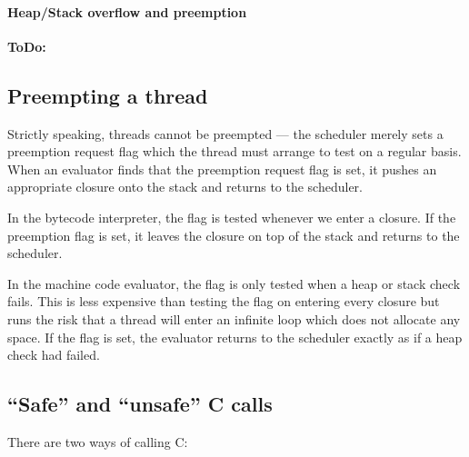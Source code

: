 \documentclass[11pt]{article}
\newcommand{\ToDo}[1]{{{\bf ToDo:}\sl #1}}
\newcommand{\Subsection}[2]{\subsection{#1}\label{sec:#2}}
\begin{document}
\paragraph{Heap/Stack overflow and preemption}

\ToDo{}


\Subsection{Preempting a thread}{thread-preemption}

Strictly speaking, threads cannot be preempted --- the scheduler
merely sets a preemption request flag which the thread must arrange to
test on a regular basis.  When an evaluator finds that the preemption
request flag is set, it pushes an appropriate closure onto the stack
and returns to the scheduler.

In the bytecode interpreter, the flag is tested whenever we enter a
closure.  If the preemption flag is set, it leaves the closure on top
of the stack and returns to the scheduler.

In the machine code evaluator, the flag is only tested when a heap or
stack check fails.  This is less expensive than testing the flag on
entering every closure but runs the risk that a thread will enter an
infinite loop which does not allocate any space.  If the flag is set,
the evaluator returns to the scheduler exactly as if a heap check had
failed.

\Subsection{``Safe'' and ``unsafe'' C calls}{c-calls}

There are two ways of calling C: 
\end{document}
